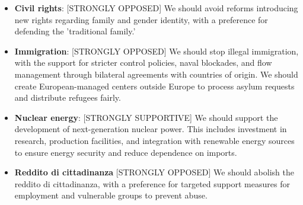 \label{Right_opinions}
\begin{tcolorbox}[prompt]
\begin{itemize}
    \item \textbf{Civil rights}:
        [STRONGLY OPPOSED] We should avoid reforms introducing new rights regarding family and gender identity, with a preference for defending the 'traditional family.'
    \item \textbf{Immigration}:
        [STRONGLY OPPOSED] We should stop illegal immigration, with the support for stricter control policies, naval blockades, and flow management through bilateral agreements with countries of origin. We should create European-managed centers outside Europe to process asylum requests and distribute refugees fairly.
    \item \textbf{Nuclear energy}: 
        [STRONGLY SUPPORTIVE] We should support the development of next-generation nuclear power. This includes investment in research, production facilities, and integration with renewable energy sources to ensure energy security and reduce dependence on imports.
    \item \textbf{Reddito di cittadinanza}
        [STRONGLY OPPOSED] We should abolish the reddito di cittadinanza, with a preference for targeted support measures for employment and vulnerable groups to prevent abuse.
\end{itemize}
\end{tcolorbox}